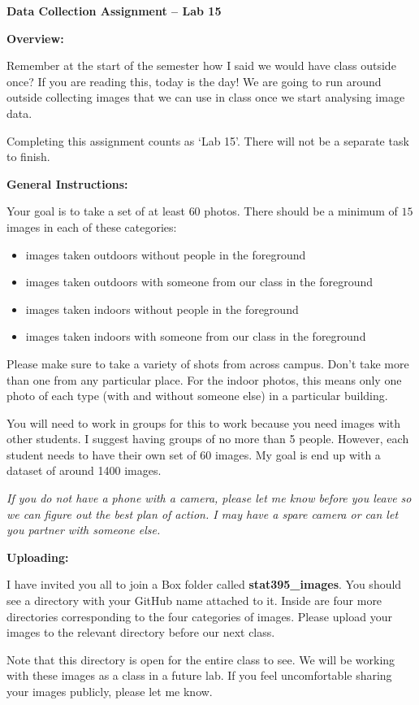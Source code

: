 \documentclass[12pt]{article}
\begin{document}
\begin{center}
{\bf Data Collection Assignment -- Lab 15} \\
\end{center}

\bigskip

\textbf{Overview:} \vspace{6pt}

Remember at the start of the semester how I said we would have
class outside once? If you are reading this, today is the day! We
are going to run around outside collecting images that we can
use in class once we start analysing image data.

Completing this assignment counts as `Lab 15'. There will not be
a separate task to finish.

\textbf{General Instructions:} \vspace{6pt}

Your goal is to take a set of at least $60$ photos. There should be
a minimum of $15$ images in each of these categories:
\begin{itemize}
\item images taken outdoors without people in the foreground
\item images taken outdoors with someone from our class in the foreground
\item images taken indoors without people in the foreground
\item images taken indoors with someone from our class in the foreground
\end{itemize}
Please make sure to take a variety of shots from across campus.
Don't take more than one from any particular place. For the indoor
photos, this means only one photo of each type (with and without someone
else) in a particular building.

You will need to work in groups for this to work because you
need images with other students. I suggest having groups of no more
than 5 people. However, each student needs to have their own set
of $60$ images. My goal is end up with a dataset of around 1400 images.

\textit{If you do not have a phone with a camera, please let me know
before you leave so we can figure out the best plan of action. I may
have a spare camera or can let you partner with someone else.}

\textbf{Uploading:} \vspace{6pt}

I have invited you all to join a Box folder called \textbf{stat395\_images}.
You should see a directory with your GitHub name attached to it. Inside are
four more directories corresponding to the four categories of images. Please
upload your images to the relevant directory before our next class.

Note that this directory is open for the entire class to see. We will be
working with these images as a class in a future lab. If you feel uncomfortable
sharing your images publicly, please let me know.
\end{document}

